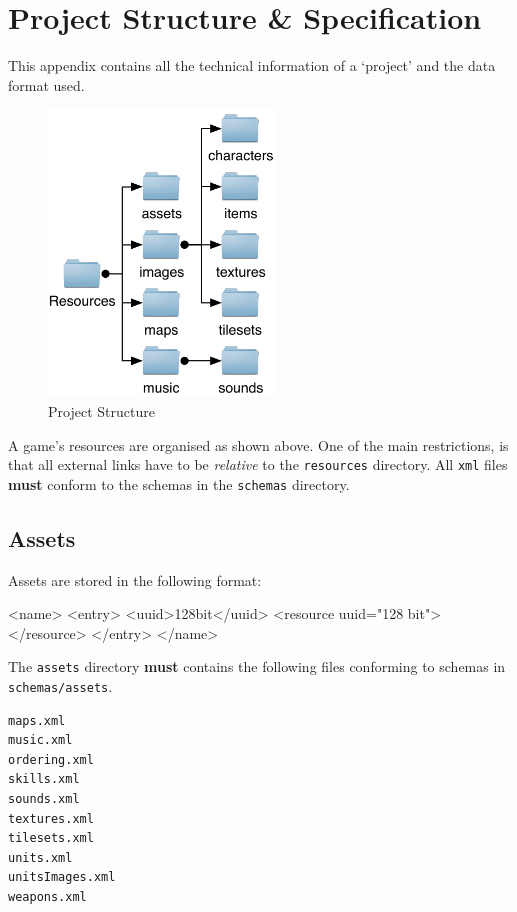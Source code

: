 \section{Project Structure \& Specification}
\label{sec:project_structure___specification}

This appendix contains all the technical information of a `project' and the data format used.

\begin{figure}[htbp]
	\centering
		\includegraphics[height=3in]{figures/Files.pdf}
	\caption{Project Structure}
	\label{fig:figures_Files}
\end{figure}

A game's resources  are organised as shown above. One of the main restrictions, is that all external links have to be \emph{relative} to the \texttt{resources} directory. All \texttt{xml} files \textbf{must} conform to the schemas in the \texttt{schemas} directory. 


\subsection{Assets}
Assets are stored in the following format:
\begin{lst:resource}[caption=Assets format]
<name>
  <entry>
    <uuid>128bit</uuid> 
    <resource uuid="128 bit">
    </resource>
  </entry>
</name>
\end{lst:resource}

The \texttt{assets} directory \textbf{must} contains the following files conforming to schemas in \texttt{schemas/assets}.
\begin{lstlisting}[caption=Required Assets]
maps.xml
music.xml
ordering.xml
skills.xml
sounds.xml
textures.xml
tilesets.xml
units.xml
unitsImages.xml
weapons.xml
\end{lstlisting}

